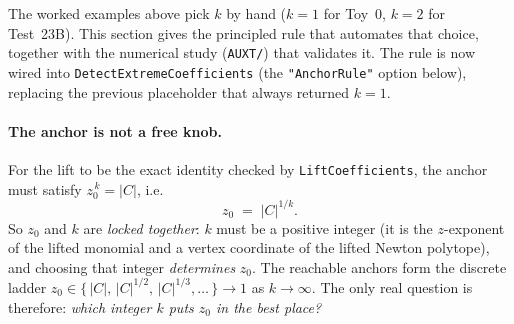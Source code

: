 \documentclass[11pt,a4paper]{article}
\begin{document}
The worked examples above pick $k$ by hand ($k=1$ for Toy~0, $k=2$ for
Test~23B). This section gives the principled rule that automates that choice,
together with the numerical study (\texttt{AUXT/}) that validates it. The rule
is now wired into \texttt{DetectExtremeCoefficients} (the \texttt{"AnchorRule"}
option below), replacing the previous placeholder that always returned $k=1$.

\paragraph{The anchor is not a free knob.} For the lift to be the exact identity
checked by \texttt{LiftCoefficients}, the anchor must satisfy
$z_0^{\,k} = |C|$, i.e.
\begin{equation}\label{eq:anchor-lock}
  z_0 \;=\; |C|^{1/k}.
\end{equation}
So $z_0$ and $k$ are \emph{locked together}: $k$ must be a positive integer (it
is the $z$-exponent of the lifted monomial and a vertex coordinate of the lifted
Newton polytope), and choosing that integer \emph{determines} $z_0$. The
reachable anchors form the discrete ladder
$z_0 \in \{\,|C|,\,|C|^{1/2},\,|C|^{1/3},\dots\,\} \to 1$ as $k \to \infty$. The
only real question is therefore: \emph{which integer $k$ puts $z_0$ in the best
place?}
\end{document}
